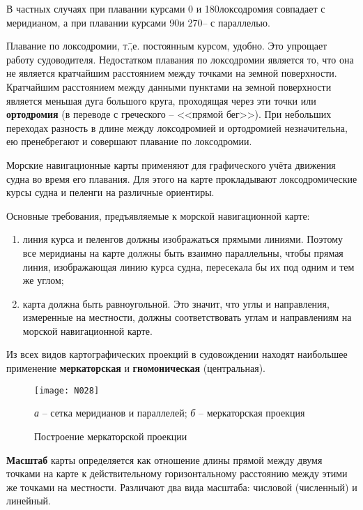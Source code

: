 В частных случаях при плавании курсами 0 и 180\gr локсодромия
совпадает с меридианом, а при плавании курсами 90\gr и 270\gr \--- с
параллелью.

Плавание по локсодромии, т.\=,е. постоянным курсом, удобно. Это
упрощает работу судоводителя. Недостатком плавания по локсодромии
является то, что она не является кратчайшим расстоянием между точками
на земной поверхности. Кратчайшим расстоянием между данными пунктами
на земной поверхности является меньшая дуга большого круга, проходящая
через эти точки или \textbf{ортодромия} (в переводе
с греческого \--- <<прямой бег>>). При небольших переходах разность в
длине между локсодромией и ортодромией незначительна, ею пренебрегают
и совершают плавание по локсодромии.

Морские навигационные карты применяют для графического учёта движения
судна во время его плавания. Для этого на карте прокладывают
локсодромические курсы судна и пеленги на различные ориентиры.

Основные требования, предъявляемые к морской навигационной карте: 

\begin{enumerate}
\item линия курса и пеленгов должны изображаться прямыми
  линиями. Поэтому все меридианы на карте должны быть взаимно
  параллельны, чтобы прямая линия, изображающая линию курса судна,
  пересекала бы их под одним и тем же углом;
\item карта должна быть равноугольной. Это значит, что углы и
  направления, измеренные на местности, должны соответствовать углам и
  направлениям на морской навигационной карте.
\end{enumerate}

Из всех видов картографических проекций в судовождении находят
наибольшее применение \textbf{меркаторская}
и \textbf{гномоническая} (центральная).

\begin{figure*}[htb]
  \centering{}
  \texttt{[image: N028]}
  \caption{Построение меркаторской проекции}
  \label{fig:N28}
  \small
  \centering{}
  \textit{а} \--- сетка меридианов и параллелей; \textit{б} \--- меркаторская проекция
\end{figure*}

\textbf{Масштаб} карты определяется как отношение
длины прямой между двумя точками на карте к действительному
горизонтальному расстоянию между этими же точками на
местности. Различают два вида масштаба: числовой (численный) и
линейный.
 
